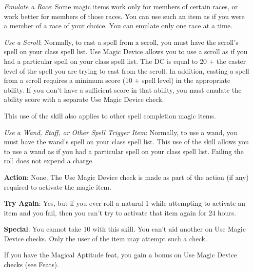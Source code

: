 \textit{Emulate a Race}: Some magic items work only for members of certain races, or work better for members of those races. You can use such an item as if you were a member of a race of your choice. You can emulate only one race at a time.
				
\textit{Use a Scroll}: Normally, to cast a spell from a scroll, you must have the scroll's spell on your class spell list. Use Magic Device allows you to use a scroll as if you had a particular spell on your class spell list. The DC is equal to 20 + the caster level of the spell you are trying to cast from the scroll. In addition, casting a spell from a scroll requires a minimum score (10 + spell level) in the appropriate ability. If you don't have a sufficient score in that ability, you must emulate the ability score with a separate Use Magic Device check.
				
This use of the skill also applies to other spell completion magic items.
				
\textit{Use a Wand, Staff, or Other Spell Trigger Item}: Normally, to use a wand, you must have the wand's spell on your class spell list. This use of the skill allows you to use a wand as if you had a particular spell on your class spell list. Failing the roll does not expend a charge.
				
\textbf{Action}: None. The Use Magic Device check is made as part of the action (if any) required to activate the magic item.
				
\textbf{Try Again}: Yes, but if you ever roll a natural 1 while attempting to activate an item and you fail, then you can't try to activate that item again for 24 hours.
				
\textbf{Special}: You cannot take 10 with this skill. You can't aid another on Use Magic Device checks. Only the user of the item may attempt such a check.
				
If you have the Magical Aptitude feat, you gain a bonus on Use Magic Device checks (see Feats).
        	
